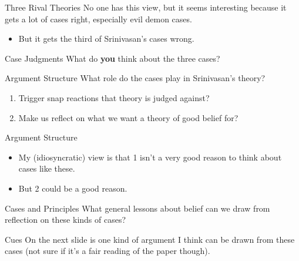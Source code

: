 \documentclass[
  17pt,
  letterpaper,
  ignorenonframetext,
  aspectratio=169,
  handout]{beamer}
\providecommand{\tightlist}{%
  \setlength{\itemsep}{0pt}\setlength{\parskip}{0pt}}\usepackage{longtable,booktabs,array}
\begin{document}
\begin{frame}{Three Rival Theories}
\protect\hypertarget{three-rival-theories-4}{}
No one has this view, but it seems interesting because it gets a lot of
cases right, especially evil demon cases.

\begin{itemize}[<+->]
\tightlist
\item
  But it gets the third of Srinivasan's cases wrong.
\end{itemize}
\end{frame}

\begin{frame}{Case Judgments}
\protect\hypertarget{case-judgments}{}
What do \textbf{you} think about the three cases?
\end{frame}

\begin{frame}{Argument Structure}
\protect\hypertarget{argument-structure}{}
What role do the cases play in Srinivasan's theory?

\begin{enumerate}[<+->]
\tightlist
\item
  Trigger snap reactions that theory is judged against?
\item
  Make us reflect on what we want a theory of good belief for?
\end{enumerate}
\end{frame}

\begin{frame}{Argument Structure}
\protect\hypertarget{argument-structure-1}{}
\begin{itemize}[<+->]
\tightlist
\item
  My (idiosyncratic) view is that 1 isn't a very good reason to think
  about cases like these.
\item
  But 2 could be a good reason.
\end{itemize}
\end{frame}

\begin{frame}{Cases and Principles}
\protect\hypertarget{cases-and-principles}{}
What general lessons about belief can we draw from reflection on these
kinds of cases?
\end{frame}

\begin{frame}{Cues}
\protect\hypertarget{cues}{}
On the next slide is one kind of argument I think can be drawn from
these cases (not sure if it's a fair reading of the paper though).
\end{frame}
\end{document}
